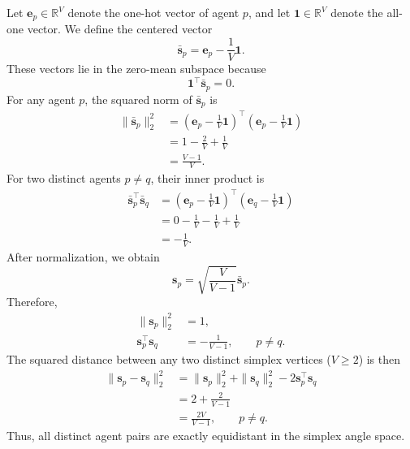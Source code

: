 Let $\mathbf{e}_p\in\mathbb{R}^{V}$ denote the one-hot vector of agent $p$, and let $\mathbf{1}\in\mathbb{R}^{V}$ denote the all-one vector. 
We define the centered vector
\begin{equation}
\bar{\mathbf{s}}_p
=
\mathbf{e}_p-\frac{1}{V}\mathbf{1}.
\end{equation}
These vectors lie in the zero-mean subspace because
\begin{equation}
\mathbf{1}^{\top}\bar{\mathbf{s}}_p=0.
\end{equation}
For any agent $p$, the squared norm of $\bar{\mathbf{s}}_p$ is
\begin{align}
\|\bar{\mathbf{s}}_p\|_2^2
&=
\left(
\mathbf{e}_p-\frac{1}{V}\mathbf{1}
\right)^{\top}
\left(
\mathbf{e}_p-\frac{1}{V}\mathbf{1}
\right) \\
&=
1-\frac{2}{V}+\frac{1}{V} \\
&=
\frac{V-1}{V}.
\end{align}
For two distinct agents $p\neq q$, their inner product is
\begin{align}
\bar{\mathbf{s}}_p^{\top}\bar{\mathbf{s}}_q
&=
\left(
\mathbf{e}_p-\frac{1}{V}\mathbf{1}
\right)^{\top}
\left(
\mathbf{e}_q-\frac{1}{V}\mathbf{1}
\right) \\
&=
0-\frac{1}{V}-\frac{1}{V}+\frac{1}{V} \\
&=
-\frac{1}{V}.
\end{align}
After normalization, we obtain
\begin{equation}
\mathbf{s}_p
=
\sqrt{\frac{V}{V-1}}
\bar{\mathbf{s}}_p.
\end{equation}
Therefore,
\begin{align}
\|\mathbf{s}_p\|_2^2 &= 1, \\
\mathbf{s}_p^{\top}\mathbf{s}_q
&=
-\frac{1}{V-1},
\qquad p\neq q.
\end{align}
The squared distance between any two distinct simplex vertices ($V\geq 2 $) is then
\begin{align}
\|\mathbf{s}_p-\mathbf{s}_q\|_2^2
&=
\|\mathbf{s}_p\|_2^2
+
\|\mathbf{s}_q\|_2^2
-
2\mathbf{s}_p^{\top}\mathbf{s}_q \\
&=
2+\frac{2}{V-1} \\
&=
\frac{2V}{V-1},
\qquad p\neq q.
\end{align}
Thus, all distinct agent pairs are exactly equidistant in the simplex angle space.

